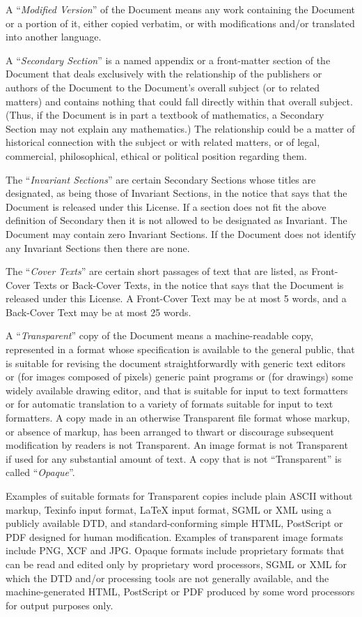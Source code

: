\documentclass[a4paper,openany]{book}
\begin{document}
\begin{results}
A ``\emph{Modified Version}'' of the Document means any work containing the
Document or a portion of it, either copied verbatim, or with
modifications and/or translated into another language.

A ``\emph{Secondary Section}'' is a named appendix or a front-matter section of
the Document that deals exclusively with the relationship of the
publishers or authors of the Document to the Document's overall subject
(or to related matters) and contains nothing that could fall directly
within that overall subject. (Thus, if the Document is in part a
textbook of mathematics, a Secondary Section may not explain any
mathematics.) The relationship could be a matter of historical
connection with the subject or with related matters, or of legal,
commercial, philosophical, ethical or political position regarding
them.

The ``\emph{Invariant Sections}'' are certain Secondary Sections whose titles
are designated, as being those of Invariant Sections, in the notice
that says that the Document is released under this License. If a
section does not fit the above definition of Secondary then it is not
allowed to be designated as Invariant. The Document may contain zero
Invariant Sections. If the Document does not identify any Invariant
Sections then there are none.

The ``\emph{Cover Texts}'' are certain short passages of text that are listed,
as Front-Cover Texts or Back-Cover Texts, in the notice that says that
the Document is released under this License. A Front-Cover Text may
be at most 5 words, and a Back-Cover Text may be at most 25 words.

A ``\emph{Transparent}'' copy of the Document means a machine-readable copy,
represented in a format whose specification is available to the
general public, that is suitable for revising the document
straightforwardly with generic text editors or (for images composed of
pixels) generic paint programs or (for drawings) some widely available
drawing editor, and that is suitable for input to text formatters or
for automatic translation to a variety of formats suitable for input
to text formatters. A copy made in an otherwise Transparent file
format whose markup, or absence of markup, has been arranged to thwart
or discourage subsequent modification by readers is not Transparent.
An image format is not Transparent if used for any substantial amount
of text. A copy that is not ``Transparent'' is called ``\emph{Opaque}''.

Examples of suitable formats for Transparent copies include plain
ASCII without markup, Texinfo input format, \LaTeX{} input format, SGML
or XML using a publicly available DTD, and standard-conforming simple
HTML, PostScript or PDF designed for human modification. Examples of
transparent image formats include PNG, XCF and JPG. Opaque formats
include proprietary formats that can be read and edited only by
proprietary word processors, SGML or XML for which the DTD and/or
processing tools are not generally available, and the
machine-generated HTML, PostScript or PDF produced by some word
processors for output purposes only.


\end{results}
\end{document}
